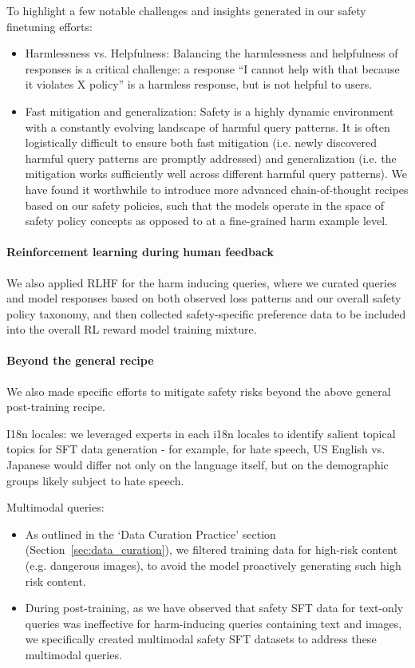 To highlight a few notable challenges and insights generated in our safety finetuning efforts:

\begin{itemize}
\item Harmlessness vs. Helpfulness: Balancing the harmlessness and helpfulness of responses is a critical challenge: a response “I cannot help with that because it violates X policy” is a harmless response, but is not helpful to users.
\item Fast mitigation and generalization: Safety is a highly dynamic environment with a constantly evolving landscape of harmful query patterns. It is often logistically difficult to ensure both fast mitigation (i.e. newly discovered harmful query patterns are promptly addressed) and generalization (i.e. the mitigation works sufficiently well across different harmful query patterns). We have found it worthwhile to introduce more advanced chain-of-thought recipes based on our safety policies, such that the models operate in the space of safety policy concepts as opposed to at a fine-grained harm example level.
\end{itemize}

\paragraph{Reinforcement learning during human feedback}

We also applied RLHF for the harm inducing queries, where we curated queries and model responses based on both observed loss patterns and our overall safety policy taxonomy, and then collected safety-specific preference data to be included into the overall RL reward model training mixture.

\paragraph{Beyond the general recipe}

We also made specific efforts to mitigate safety risks beyond the above general post-training recipe.

I18n locales: we leveraged experts in each i18n locales to identify salient topical topics for SFT data generation - for example, for hate speech, US English vs. Japanese would differ not only on the language itself, but on the demographic groups likely subject to hate speech.

Multimodal queries:

\begin{itemize}
\item As outlined in the ‘Data Curation Practice’ section (Section~\ref{sec:data_curation}), we filtered training data for high-risk content (e.g. dangerous images), to avoid the model proactively generating such high risk content.
\item During post-training, as we have observed that safety SFT data for text-only queries was ineffective for harm-inducing queries containing text and images, we specifically created multimodal safety SFT datasets to address these multimodal queries.
\end{itemize}

